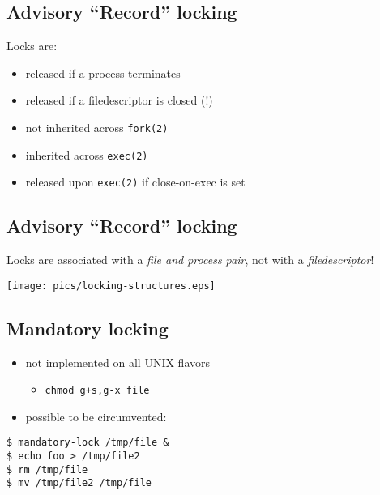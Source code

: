 \documentclass[xga]{xdvislides}
\begin{document}
\subsection{Advisory ``Record'' locking}
Locks are:
\begin{itemize}
	\item released if a process terminates
	\item released if a filedescriptor is closed (!)
	\item not inherited across {\tt fork(2)}
	\item inherited across {\tt exec(2)}
	\item released upon {\tt exec(2)} if close-on-exec is set
\end{itemize}

%
\subsection{Advisory ``Record'' locking}
Locks are associated with a {\em file and process pair}, not with a {\em filedescriptor}!
\begin{center}
	\texttt{[image: pics/locking-structures.eps]}
\end{center}

\subsection{Mandatory locking}
\begin{itemize}
	\item not implemented on all UNIX flavors
		\begin{itemize}
			\item {\tt chmod g+s,g-x file}
		\end{itemize}
	\item possible to be circumvented:
\end{itemize}
\begin{verbatim}
$ mandatory-lock /tmp/file &
$ echo foo > /tmp/file2
$ rm /tmp/file
$ mv /tmp/file2 /tmp/file
\end{verbatim}
\end{document}
